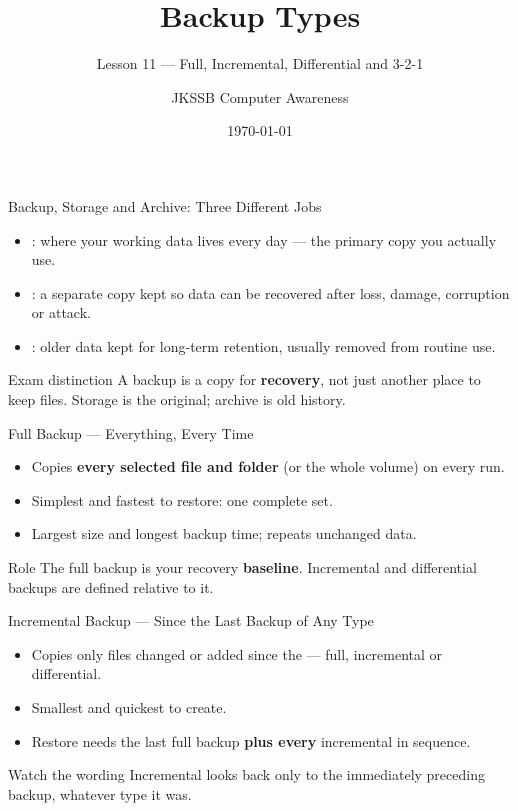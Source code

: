 \documentclass[aspectratio=169]{beamer}
\title{Backup Types}
\subtitle{Lesson 11 --- Full, Incremental, Differential and 3-2-1}
\author{JKSSB Computer Awareness}
\date{\today}
\begin{document}
\frame{\titlepage}

\begin{frame}{Backup, Storage and Archive: Three Different Jobs}
  \begin{itemize}
    \item {}: where your working data lives every day --- the
      primary copy you actually use.
    \item {}: a separate copy kept so data can be recovered after
      loss, damage, corruption or attack.
    \item {}: older data kept for long-term retention, usually
      removed from routine use.
  \end{itemize}
  \begin{alertblock}{Exam distinction}
    A backup is a copy for \textbf{recovery}, not just another place to keep
    files. Storage is the original; archive is old history.
  \end{alertblock}
\end{frame}

\begin{frame}{Full Backup --- Everything, Every Time}
  \begin{itemize}
    \item Copies \textbf{every selected file and folder} (or the whole volume)
      on every run.
    \item \good{+} Simplest and fastest to restore: one complete set.
    \item \bad{--} Largest size and longest backup time; repeats unchanged
      data.
  \end{itemize}
  \begin{block}{Role}
    The full backup is your recovery \textbf{baseline}. Incremental and
    differential backups are defined relative to it.
  \end{block}
\end{frame}

\begin{frame}{Incremental Backup --- Since the Last Backup of Any Type}
  \begin{itemize}
    \item Copies only files changed or added since the  --- full, incremental or differential.
    \item \good{+} Smallest and quickest to create.
    \item \bad{--} Restore needs the last full backup \textbf{plus every}
      incremental in sequence.
  \end{itemize}
  \begin{alertblock}{Watch the wording}
    Incremental looks back only to the immediately preceding backup, whatever
    type it was.
  \end{alertblock}
\end{frame}
\end{document}
